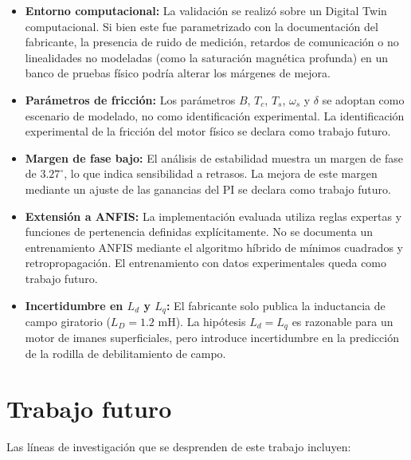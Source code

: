 \begin{itemize}
\item \textbf{Entorno computacional:} La validación se realizó sobre un Digital Twin computacional. Si bien este fue parametrizado con la documentación del fabricante, la presencia de ruido de medición, retardos de comunicación o no linealidades no modeladas (como la saturación magnética profunda) en un banco de pruebas físico podría alterar los márgenes de mejora.

\item \textbf{Parámetros de fricción:} Los parámetros $B$, $T_c$, $T_s$, $\omega_s$ y $\delta$ se adoptan como escenario de modelado, no como identificación experimental. La identificación experimental de la fricción del motor físico se declara como trabajo futuro.

\item \textbf{Margen de fase bajo:} El análisis de estabilidad muestra un margen de fase de $3.27^\circ$, lo que indica sensibilidad a retrasos. La mejora de este margen mediante un ajuste de las ganancias del PI se declara como trabajo futuro.

\item \textbf{Extensión a ANFIS:} La implementación evaluada utiliza reglas expertas y funciones de pertenencia definidas explícitamente. No se documenta un entrenamiento ANFIS mediante el algoritmo híbrido de mínimos cuadrados y retropropagación. El entrenamiento con datos experimentales queda como trabajo futuro.

\item \textbf{Incertidumbre en $L_d$ y $L_q$:} El fabricante solo publica la inductancia de campo giratorio ($L_D = 1.2$ mH). La hipótesis $L_d = L_q$ es razonable para un motor de imanes superficiales, pero introduce incertidumbre en la predicción de la rodilla de debilitamiento de campo.
\end{itemize}

\section{Trabajo futuro}
\label{sec:cap6_trabajo_futuro}

Las líneas de investigación que se desprenden de este trabajo incluyen:

